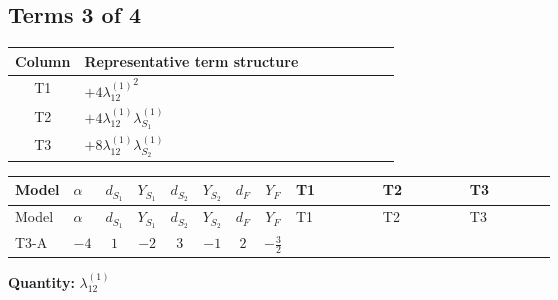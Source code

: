 \documentclass[8pt]{article}
\begin{document}
\begin{landscape}
\subsection*{Terms 3 of 4}
\begin{center}
\begin{tabular}{@{}c >{\raggedright\arraybackslash}p{0.82\linewidth}@{}}
\toprule
Column & Representative term structure \\
\midrule
T1 & \(\displaystyle +4 {\lambda_{12}^{(1)}}^2\) \\
\midrule
T2 & \(\displaystyle +4 {\lambda_{12}^{(1)}} {\lambda_{S_1}^{(1)}}\) \\
\midrule
T3 & \(\displaystyle +8 {\lambda_{12}^{(1)}} {\lambda_{S_2}^{(1)}}\) \\
\midrule
\bottomrule
\end{tabular}
\end{center}
\smallskip
\tiny
\begin{longtable}{@{}llcccccc >{\raggedright\arraybackslash}p{0.21\linewidth} >{\raggedright\arraybackslash}p{0.21\linewidth} >{\raggedright\arraybackslash}p{0.21\linewidth}@{}}
\toprule
Model & $\alpha$ & $d_{S_1}$ & $Y_{S_1}$ & $d_{S_2}$ & $Y_{S_2}$ & $d_F$ & $Y_F$ & T1 & T2 & T3 \\
\midrule
\endfirsthead
\toprule
Model & $\alpha$ & $d_{S_1}$ & $Y_{S_1}$ & $d_{S_2}$ & $Y_{S_2}$ & $d_F$ & $Y_F$ & T1 & T2 & T3 \\
\midrule
\endhead
T3-A & $-4$ & $1$ & $-2$ & $3$ & $-1$ & $2$ & $-\frac{3}{2}$ & \scriptsize\adjustbox{max width=\linewidth}{$\begin{gathered} +4 {\lambda_{12}^{(1)}}^2\end{gathered}$} & \scriptsize\adjustbox{max width=\linewidth}{$\begin{gathered} +4 {\lambda_{12}^{(1)}} {\lambda_{S_1}^{(1)}}\end{gathered}$} & \scriptsize\adjustbox{max width=\linewidth}{$\begin{gathered} +8 {\lambda_{12}^{(1)}} {\lambda_{S_2}^{(1)}}\end{gathered}$} \\
\midrule
\bottomrule
\end{longtable}
\clearpage
\noindent\textbf{Quantity: }$\lambda_{12}^{(1)}$\par\smallskip

\end{landscape}
\end{document}
